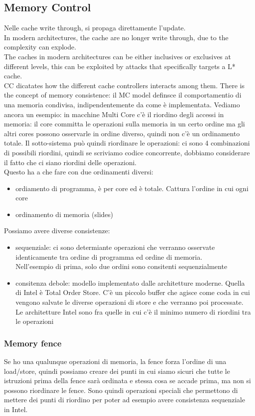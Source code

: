 \documentclass[12pt, oneside]{extbook} %
\begin{document}
\subsection{Memory Control}
Nelle cache write through, si propaga direttamente l'update.\\ In modern architectures, the cache are no longer write through, due to the complexity can explode.\\ The caches in modern architectures can be either inclusives or exclusives at different levels, this can be exploited by attacks that specifically targets a L* cache.\\ CC dicatates how the different cache controllers interacts among them. There is the concept of memory consistence: il MC model definsce il comportamentio di una memoria condivisa, indipendentemente da come è implementata. Vediamo ancora un esempio:
in macchine Multi Core c'è il riordino degli accessi in memoria: il core committa le operazioni sulla memoria in un certo ordine ma gli altri cores possono osservarle in ordine diverso, quindi non c'è un ordinamento totale. Il sotto-sistema può quindi riordinare le operazioni: 
ci sono 4 combinazioni di possibili riordini, quindi se scriviamo codice concorrente, dobbiamo considerare il fatto che ci siano riordini delle operazioni.\\ Questo ha a che fare con due ordinamenti diversi:
\begin{itemize}
\item ordiamento di programma, è per core ed è totale. Cattura l'ordine in cui ogni core 
\item ordinamento di memoria (slides)
\end{itemize}
Possiamo avere diverse consistenze:
\begin{itemize}
\item sequenziale: ci sono determiante operazioni che verranno osservate identicamente tra ordine di programma ed ordine di memoria.\\ Nell'esempio di prima, solo due ordini sono consitenti sequenzialmente
\item consitenza debole: modello implementato dalle architetture moderne. Quella di Intel è Total Order Store. C'è un piccolo buffer che agisce come coda in cui vengono salvate le diverse operazioni di store e che verranno poi processate. Le architetture Intel sono fra quelle in cui c'è il minimo numero di riordini tra le operazioni
\end{itemize}
\subsubsection{Memory fence}
Se ho una qualunque operazioni di memoria, la fence forza l'ordine di una load/store, quindi possiamo creare dei punti in cui siamo sicuri che tutte le istruzioni prima della fence sarà ordinata e stessa cosa se accade prima, ma non si possono riordinare le fence. Sono quindi operazioni speciali che permettono di mettere dei punti di riordino per poter ad esempio avere consistenza sequenziale in Intel.
\end{document}
